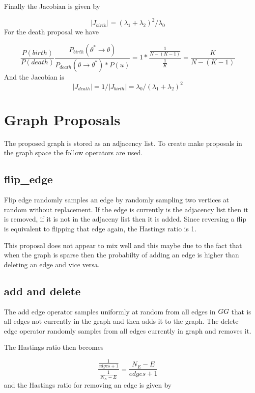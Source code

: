 \documentclass[]{article}
\numberwithin{equation}{section}
\begin{document}
Finally the Jacobian is given by

\[ |J_{birth}| = (\lambda_1 + \lambda_2)^2/\lambda_0\] For the death
proposal we have

\[ \frac{P(birth)}{P(death)}\frac{P_{birth}(\theta^*\rightarrow\theta)}{P_{death}(\theta\rightarrow \theta^*)*P(u)} = 1*\frac{\frac{1}{N-(K-1)}}{\frac{1}{K}} = \frac{K}{N-(K-1)} \]
And the Jacobian is
\[|J_{death}| = 1/|J_{birth}| = \lambda_0/(\lambda_1 + \lambda_2)^2\]

\hypertarget{graph-proposals}{%
\section{Graph Proposals}\label{graph-proposals}}

The proposed graph is stored as an adjacency list. To create make
proposals in the graph space the follow operators are used.

\hypertarget{flip_edge}{%
\subsection{flip\_edge}\label{flip_edge}}

Flip edge randomly samples an edge by randomly sampling two vertices at
random without replacement. If the edge is currently is the adjacency
list then it is removed, if it is not in the adjaceny list then it is
added. Since reversing a flip is equivalent to flipping that edge again,
the Hastings ratio is 1.

This proposal does not appear to mix well and this maybe due to the fact
that when the graph is sparse then the probabilty of adding an edge is
higher than deleting an edge and vice versa.

\hypertarget{add-and-delete}{%
\subsection{add and delete}\label{add-and-delete}}

The add edge operator samples uniformly at random from all edges in
\(G\\G\) that is all edges not currently in the graph and then adds it
to the graph. The delete edge operator randomly samples from all edges
currently in graph and removes it.

The Hastings ratio then becomes

\[ \frac{\frac{1}{edges + 1}}{\frac{1}{N_E - E}} = \frac{N_E-E}{edges + 1} \]
and the Hastings ratio for removing an edge is given by
\end{document}
